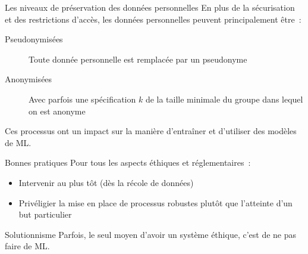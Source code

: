 \begin{frame}{Les niveaux de préservation des données personnelles}
  En plus de la sécurisation et des restrictions d'accès, les données personnelles peuvent principalement être~:
  \begin{description}
    \item[Pseudonymisées] Toute donnée personnelle est remplacée par un pseudonyme
    \item[Anonymisées] Avec parfois une spécification $k$ de la taille minimale du groupe dans lequel on est anonyme
  \end{description}

  Ces processus ont un impact sur la manière d'entraîner et d'utiliser des modèles de ML.
\end{frame}

\begin{frame}{Bonnes pratiques}
  Pour tous les aspects éthiques et réglementaires~:

  \begin{itemize}
    \item Intervenir au plus tôt (dès la récole de données)
    \item Privéligier la mise en place de processus robustes plutôt que l'atteinte d'un but particulier
  \end{itemize}
\end{frame}

\begin{frame}{Solutionnisme}
  Parfois, le seul moyen d'avoir un système éthique, c'est de \alert{ne pas} faire de ML.
\end{frame}